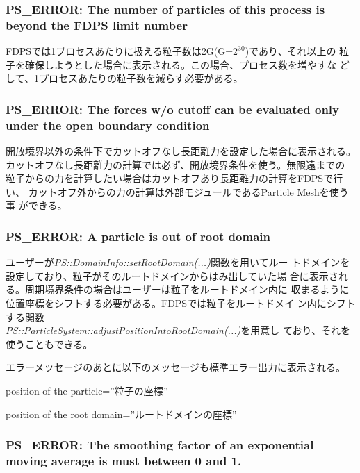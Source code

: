 \subsubsection{PS\_ERROR: The number of particles of this process is beyond the FDPS limit number}

FDPSでは1プロセスあたりに扱える粒子数は2G(G=$2^{30}$)であり、それ以上の
粒子を確保しようとした場合に表示される。この場合、プロセス数を増やすな
どして、1プロセスあたりの粒子数を減らす必要がある。

\subsubsection{PS\_ERROR: The forces w/o cutoff can be evaluated only under the open boundary condition}

開放境界以外の条件下でカットオフなし長距離力を設定した場合に表示される。
カットオフなし長距離力の計算では必ず、開放境界条件を使う。無限遠までの
粒子からの力を計算したい場合はカットオフあり長距離力の計算をFDPSで行い、
カットオフ外からの力の計算は外部モジュールであるParticle Meshを使う事
ができる。

\subsubsection{PS\_ERROR: A particle is out of root domain}

ユーザーが\textit{PS::DomainInfo::setRootDomain(...)}関数を用いてルー
トドメインを設定しており、粒子がそのルートドメインからはみ出していた場
合に表示される。周期境界条件の場合はユーザーは粒子をルートドメイン内に
収まるように位置座標をシフトする必要がある。FDPSでは粒子をルートドメイ
ン内にシフトする関数\\
\textit{PS::ParticleSystem::adjustPositionIntoRootDomain(...)}を用意し
ており、それを使うこともできる。

エラーメッセージのあとに以下のメッセージも標準エラー出力に表示される。

\begin{screen}
  position of the particle=''粒子の座標''

  position of the root domain=''ルートドメインの座標''
\end{screen}


\subsubsection{PS\_ERROR: The smoothing factor of an exponential moving average is must between 0 and 1.}

